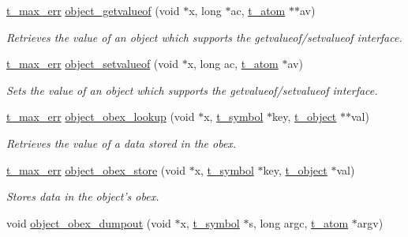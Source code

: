 \begin{DoxyCompactItemize}
\hyperlink{group__datatypes_ga73edaae82b318855cc09fac994918165}{t\_\-max\_\-err} \hyperlink{group__obj_gab033973cea2f4a0b17bb48ab2f22f051}{object\_\-getvalueof} (void $\ast$x, long $\ast$ac, \hyperlink{structt__atom}{t\_\-atom} $\ast$$\ast$av)
\begin{DoxyCompactList}\small\item\em Retrieves the value of an object which supports the {\ttfamily getvalueof/setvalueof} interface. \item\end{DoxyCompactList}\item 
\hyperlink{group__datatypes_ga73edaae82b318855cc09fac994918165}{t\_\-max\_\-err} \hyperlink{group__obj_ga9d653fc9249f24c462f14657b969cc4d}{object\_\-setvalueof} (void $\ast$x, long ac, \hyperlink{structt__atom}{t\_\-atom} $\ast$av)
\begin{DoxyCompactList}\small\item\em Sets the value of an object which supports the {\ttfamily getvalueof/setvalueof} interface. \item\end{DoxyCompactList}\item 
\hyperlink{group__datatypes_ga73edaae82b318855cc09fac994918165}{t\_\-max\_\-err} \hyperlink{group__obj_gaba3a848eba4f4b834c1f89377c75e281}{object\_\-obex\_\-lookup} (void $\ast$x, \hyperlink{structt__symbol}{t\_\-symbol} $\ast$key, \hyperlink{structt__object}{t\_\-object} $\ast$$\ast$val)
\begin{DoxyCompactList}\small\item\em Retrieves the value of a data stored in the obex. \item\end{DoxyCompactList}\item 
\hyperlink{group__datatypes_ga73edaae82b318855cc09fac994918165}{t\_\-max\_\-err} \hyperlink{group__obj_gaccdb93572405a2e9f065086f9c3dfe41}{object\_\-obex\_\-store} (void $\ast$x, \hyperlink{structt__symbol}{t\_\-symbol} $\ast$key, \hyperlink{structt__object}{t\_\-object} $\ast$val)
\begin{DoxyCompactList}\small\item\em Stores data in the object's obex. \item\end{DoxyCompactList}\item 
void \hyperlink{group__obj_ga95edf6b869d6c5be94a59e49dddb0935}{object\_\-obex\_\-dumpout} (void $\ast$x, \hyperlink{structt__symbol}{t\_\-symbol} $\ast$s, long argc, \hyperlink{structt__atom}{t\_\-atom} $\ast$argv)

\end{DoxyCompactItemize}
